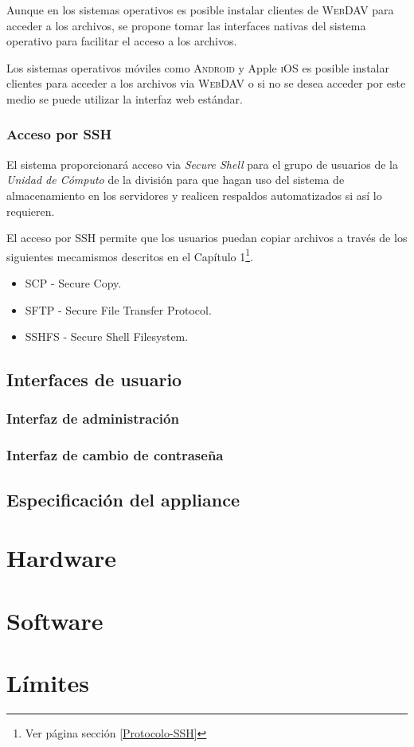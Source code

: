 Aunque en los sistemas operativos es posible instalar clientes de \textsc{WebDAV} para acceder a los archivos, se propone tomar las interfaces nativas del sistema operativo para facilitar el acceso a los archivos.

Los sistemas operativos m\'{o}viles como \textsc{Android} y Apple \textsc{iOS} es posible instalar clientes para acceder a los archivos via \textsc{WebDAV} o si no se desea acceder por este medio se puede utilizar la interfaz web est\'{a}ndar.

        \subsubsection {Acceso por SSH}

El sistema proporcionar\'{a} acceso via \textit{Secure Shell} para el grupo de usuarios de la \textit{Unidad de C\'{o}mputo} de la divisi\'{o}n para que hagan uso del sistema de almacenamiento en los servidores y realicen respaldos automatizados si as\'{i} lo requieren.

El acceso por \textsc{SSH} permite que los usuarios puedan copiar archivos a trav\'{e}s de los siguientes mecamismos descritos en el Cap\'{i}tulo 1\footnote{Ver p\'{a}gina \pageref{Protocolo-SSH} secci\'{o}n \ref{Protocolo-SSH}}.

\begin{itemize}
  \item{\textsc{SCP} - Secure Copy}.
  \item{\textsc{SFTP} - Secure File Transfer Protocol}.
  \item{\textsc{SSHFS} - Secure Shell Filesystem}.
\end{itemize}

      \subsection {Interfaces de usuario}



        \subsubsection {Interfaz de administraci\'{o}n}



        \subsubsection {Interfaz de cambio de contrase\~{n}a}



    \subsection {Especificaci\'{o}n del appliance}
      \section {Hardware}
      \section {Software}
      \section {L\'{i}mites}
